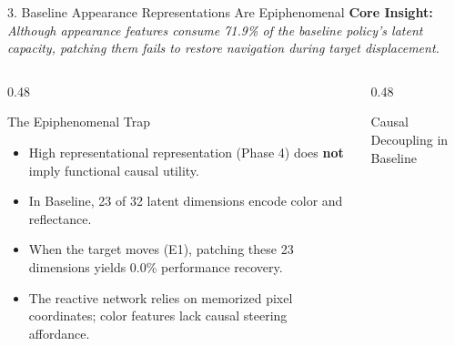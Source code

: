 \documentclass[aspectratio=169, 10pt]{beamer}
\begin{document}
\begin{frame}{3. Baseline Appearance Representations Are Epiphenomenal}
  \textbf{Core Insight:} \textit{Although appearance features consume 71.9\% of the baseline policy's latent capacity, patching them fails to restore navigation during target displacement.}

  \vspace{0.2cm}
  \begin{columns}[T]
    \begin{column}{0.48\textwidth}
      \begin{block}{The Epiphenomenal Trap}
        \small
        \begin{itemize}
          \item High representational representation (Phase 4) does \textbf{not} imply functional causal utility.
          \item In Baseline, 23 of 32 latent dimensions encode color and reflectance.
          \item When the target moves (E1), patching these 23 dimensions yields \alert{0.0\% performance recovery}.
          \item The reactive network relies on memorized pixel coordinates; color features lack causal steering affordance.
        \end{itemize}
      \end{block}
    \end{column}

    \begin{column}{0.48\textwidth}
      \begin{block}{Causal Decoupling in Baseline}
        \centering
\end{block}
\end{column}
\end{columns}
\end{frame}
\end{document}
